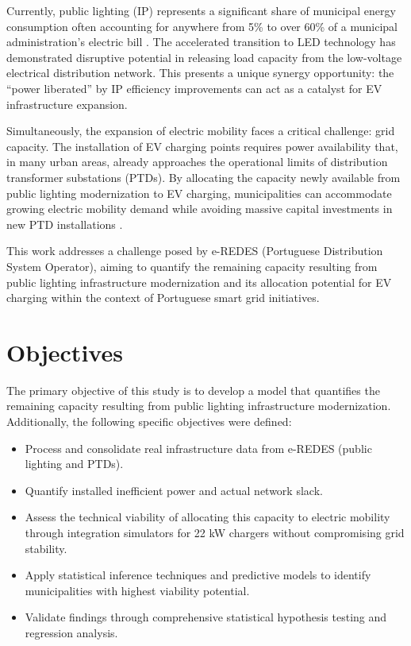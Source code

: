 \documentclass[conference]{IEEEtran}
\begin{document}
Currently, public lighting (IP) represents a significant share of municipal energy consumption often accounting for anywhere from 5\% to over 60\% of a municipal administration's electric bill \cite{Rossi2016}. The accelerated transition to LED technology has demonstrated disruptive potential in releasing load capacity from the low-voltage electrical distribution network. This presents a unique synergy opportunity: the ``power liberated'' by IP efficiency improvements can act as a catalyst for EV infrastructure expansion.

Simultaneously, the expansion of electric mobility faces a critical challenge: grid capacity. The installation of EV charging points requires power availability that, in many urban areas, already approaches the operational limits of distribution transformer substations (PTDs). By allocating the capacity newly available from public lighting modernization to EV charging, municipalities can accommodate growing electric mobility demand while avoiding massive capital investments in new PTD installations \cite{Gouveia2015}.

This work addresses a challenge posed by e-REDES (Portuguese Distribution System Operator), aiming to quantify the remaining capacity resulting from public lighting infrastructure modernization and its allocation potential for EV charging within the context of Portuguese smart grid initiatives. 

\section{Objectives}

The primary objective of this study is to develop a model that quantifies the remaining capacity resulting from public lighting infrastructure modernization. Additionally, the following specific objectives were defined:

\begin{itemize}
\item Process and consolidate real infrastructure data from e-REDES (public lighting and PTDs).

\item Quantify installed inefficient power and actual network slack.

\item Assess the technical viability of allocating this capacity to electric mobility through integration simulators for 22 kW chargers without compromising grid stability.

\item Apply statistical inference techniques and predictive models to identify municipalities with highest viability potential.

\item Validate findings through comprehensive statistical hypothesis testing and regression analysis.
\end{itemize}
\end{document}
